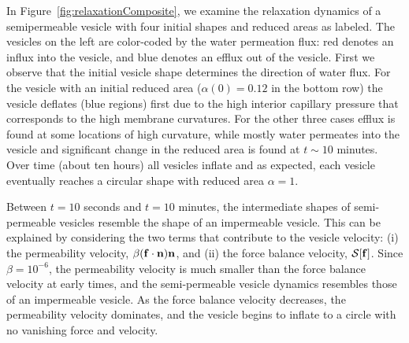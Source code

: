 \documentclass[9pt,twocolumn,twoside,lineno]{pnas-new}
\begin{document}
In Figure~\ref{fig:relaxationComposite}, we examine the relaxation
dynamics of a semipermeable vesicle with four initial shapes and reduced areas as labeled.
The vesicles on the left are color-coded by the water permeation flux: red denotes an influx into the vesicle, and blue denotes an efflux out of the vesicle.
%
First we observe that the initial vesicle shape determines the direction of water flux.
For the vesicle with an initial reduced area ($\alpha(0)=0.12$ in the bottom row) the vesicle deflates (blue regions) first due to the high interior capillary pressure that corresponds to the high membrane curvatures.
For the other three cases efflux is found at some locations of high curvature, while mostly water permeates into the vesicle and significant change in the reduced area is found at $t\sim 10$ minutes.  Over time (about ten hours) all vesicles inflate and as expected, each vesicle eventually
reaches a circular shape with reduced area $\alpha=1$. 
%
%

Between $t=10$ seconds and $t=10$ minutes, the 
intermediate shapes of semi-permeable
vesicles resemble the shape of an impermeable vesicle. This can be
explained by considering the two terms that contribute to the vesicle
velocity: (i) the permeability velocity, $\beta(\mathbf{f} \cdot \mathbf{n}) \mathbf{n}$, and
(ii) the force balance velocity, $\mathcal{S}[\mathbf{f}]$. Since $\beta = 10^{-6}$,
the permeability velocity is much smaller than the force balance
velocity at early times, and the semi-permeable vesicle dynamics
resembles those of an impermeable vesicle. As the force balance velocity
decreases, the permeability velocity dominates, and the vesicle begins
to inflate to a circle with no vanishing force and velocity. 
\end{document}

